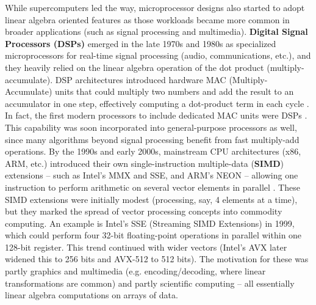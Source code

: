 While supercomputers led the way, microprocessor designs also started to adopt linear algebra oriented features as those workloads became more common in broader applications (such as signal processing and multimedia). \textbf{Digital Signal Processors (DSPs)} emerged in the late 1970s and 1980s as specialized microprocessors for real-time signal processing (audio, communications, etc.), and they heavily relied on the linear algebra operation of the dot product (multiply-accumulate). DSP architectures introduced hardware MAC (Multiply-Accumulate) units that could multiply two numbers and add the result to an accumulator in one step, effectively computing a dot-product term in each cycle \cite{oppenheim2014}. In fact, the first modern processors to include dedicated MAC units were DSPs \cite{eyre2000evolution}. This capability was soon incorporated into general-purpose processors as well, since many algorithms beyond signal processing benefit from fast multiply-add operations. By the 1990s and early 2000s, mainstream CPU architectures (x86, ARM, etc.) introduced their own single-instruction multiple-data (\textbf{SIMD}) extensions – such as Intel’s MMX and SSE, and ARM’s NEON – allowing one instruction to perform arithmetic on several vector elements in parallel \cite{conte1996simd, firasta2008intel, goodacre2005arm}. These SIMD extensions were initially modest (processing, say, 4 elements at a time), but they marked the spread of vector processing concepts into commodity computing. An example is Intel’s SSE (Streaming SIMD Extensions) in 1999, which could perform four 32-bit floating-point operations in parallel within one 128-bit register. This trend continued with wider vectors (Intel’s AVX later widened this to 256 bits and AVX-512 to 512 bits). The motivation for these was partly graphics and multimedia (e.g. encoding/decoding, where linear transformations are common) and partly scientific computing – all essentially linear algebra computations on arrays of data.

